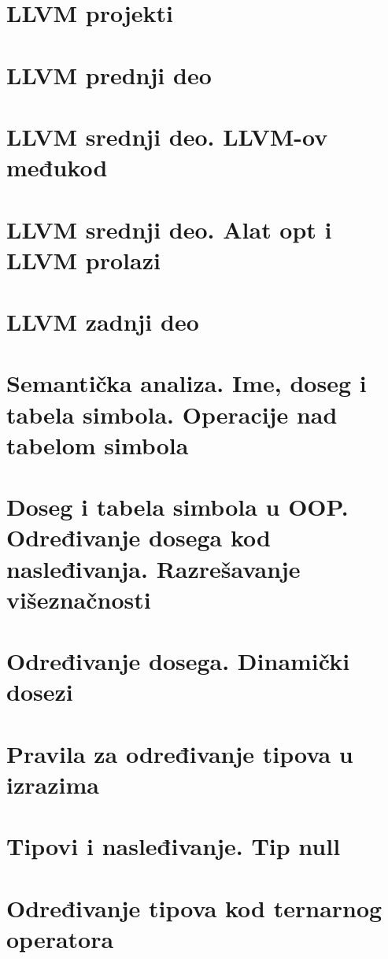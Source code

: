 \documentclass[10pt]{extarticle}
\begin{document}
\section{LLVM projekti}

\section{LLVM prednji deo}

\section{LLVM srednji deo. LLVM-ov međukod}

\section{LLVM srednji deo. Alat opt i LLVM prolazi}

\section{LLVM zadnji deo}

\section{Semantička analiza. Ime, doseg i tabela simbola. Operacije nad tabelom simbola}

\section{Doseg i tabela simbola u OOP. Određivanje dosega kod nasleđivanja. Razrešavanje višeznačnosti}

\section{Određivanje dosega. Dinamički dosezi}

\section{Pravila za određivanje tipova u izrazima}

\section{Tipovi i nasleđivanje. Tip null}

\section{Određivanje tipova kod ternarnog operatora}
\end{document}
